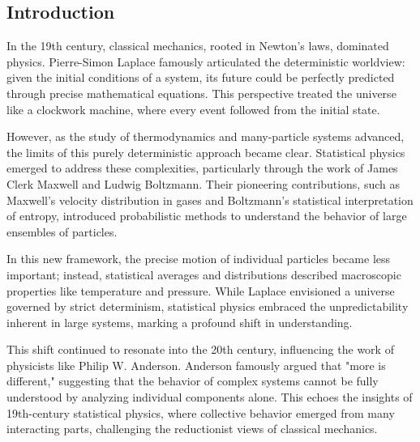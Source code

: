 \documentclass[ansiapaper]{report}
\author{Andrea}
\begin{document}
\fontsize{9}{10}\selectfont%

\renewcommand{\contentsname}{Contents} %


\vskip6pt
\begin{center}
	\noindent {}
\end{center}
\vskip9pt

\begin{multicols}{3}

	\renewcommand{\baselinestretch}{1.1}\normalsize %
	{\footnotesize \sffamily \tableofcontents} %



	\renewcommand{\baselinestretch}{1.0}\normalsize

	\fontsize{9}{10}\selectfont
	\chapter{Introduction}
	In the 19th century, classical mechanics, rooted in Newton’s laws, dominated physics. Pierre-Simon Laplace famously articulated the deterministic worldview: given the initial conditions of a system, its future could be perfectly predicted through precise mathematical equations. This perspective treated the universe like a clockwork machine, where every event followed from the initial state.

	However, as the study of thermodynamics and many-particle systems advanced, the limits of this purely deterministic approach became clear. Statistical physics emerged to address these complexities, particularly through the work of James Clerk Maxwell and Ludwig Boltzmann. Their pioneering contributions, such as Maxwell's velocity distribution in gases and Boltzmann's statistical interpretation of entropy, introduced probabilistic methods to understand the behavior of large ensembles of particles.

	In this new framework, the precise motion of individual particles became less important; instead, statistical averages and distributions described macroscopic properties like temperature and pressure. While Laplace envisioned a universe governed by strict determinism, statistical physics embraced the unpredictability inherent in large systems, marking a profound shift in understanding.

	This shift continued to resonate into the 20th century, influencing the work of physicists like Philip W. Anderson. Anderson famously argued that "more is different," suggesting that the behavior of complex systems cannot be fully understood by analyzing individual components alone. This echoes the insights of 19th-century statistical physics, where collective behavior emerged from many interacting parts, challenging the reductionist views of classical mechanics.


\end{multicols}
\end{document}
